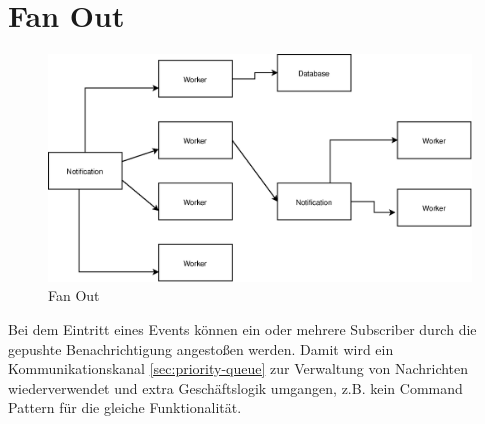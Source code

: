 \documentclass[
12pt,
english,
ngerman,
headsepline,
twoside,
openright,
numbers=noenddot,version=first
]{scrreprt}
\begin{document}
\section{Fan Out}
\label{sec:fan-out}
\begin{figure}[h!]
	\centering{}
	\includegraphics[scale=0.50]{./pics/pattern-fan-out.eps}
	\caption{Fan Out}
	\label{pic:fan-out}
\end{figure}
Bei dem Eintritt eines Events können ein oder mehrere Subscriber durch die gepushte Benachrichtigung angestoßen werden. Damit wird ein Kommunikationskanal  \autoref{sec:priority-queue} zur Verwaltung von Nachrichten wiederverwendet und extra Geschäftslogik umgangen, z.B. kein Command Pattern für die gleiche Funktionalität\cite{serverlessArchAWS}.
\end{document}
